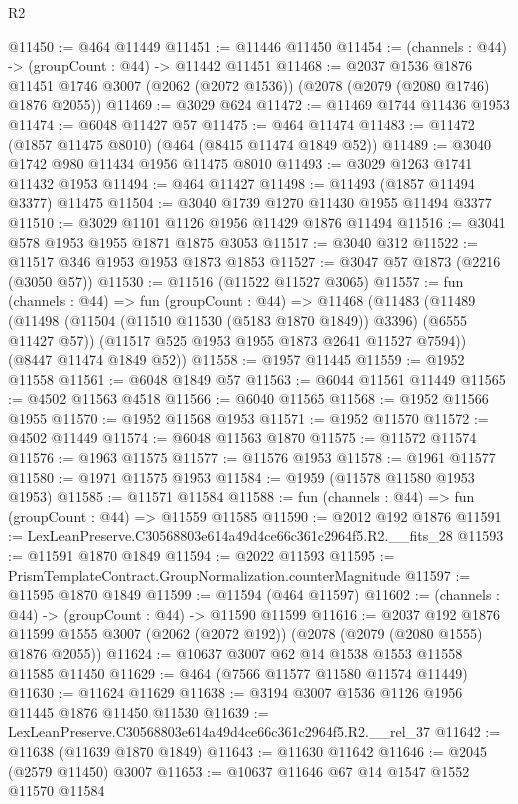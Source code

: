 \begin{lexlean}{R2}
\begin{coremodule}
@11450 := @464 @11449
@11451 := @11446 @11450
@11454 := (channels : @44) -> (groupCount : @44) -> @11442 @11451
@11468 := @2037
    @1536
    @1876
    @11451
    @1746
    @3007
    (@2062 (@2072 @1536))
    (@2078 (@2079 (@2080 @1746) @1876 @2055))
@11469 := @3029 @624
@11472 := @11469 @1744 @11436 @1953
@11474 := @6048 @11427 @57
@11475 := @464 @11474
@11483 := @11472 (@1857 @11475 @8010) (@464 (@8415 @11474 @1849 @52))
@11489 := @3040 @1742 @980 @11434 @1956 @11475 @8010
@11493 := @3029 @1263 @1741 @11432 @1953
@11494 := @464 @11427
@11498 := @11493 (@1857 @11494 @3377) @11475
@11504 := @3040 @1739 @1270 @11430 @1955 @11494 @3377
@11510 := @3029 @1101 @1126 @1956 @11429 @1876 @11494
@11516 := @3041 @578 @1953 @1955 @1871 @1875 @3053
@11517 := @3040 @312
@11522 := @11517 @346 @1953 @1953 @1873 @1853
@11527 := @3047 @57 @1873 (@2216 (@3050 @57))
@11530 := @11516 (@11522 @11527 @3065)
@11557 := fun (channels : @44) =>
  fun (groupCount : @44) =>
  @11468
    (@11483
      (@11489
        (@11498 (@11504 (@11510 @11530 (@5183 @1870 @1849)) @3396) (@6555 @11427 @57))
        (@11517 @525 @1953 @1955 @1873 @2641 @11527 @7594))
      (@8447 @11474 @1849 @52))
@11558 := @1957 @11445
@11559 := @1952 @11558
@11561 := @6048 @1849 @57
@11563 := @6044 @11561 @11449
@11565 := @4502 @11563 @4518
@11566 := @6040 @11565
@11568 := @1952 @11566 @1955
@11570 := @1952 @11568 @1953
@11571 := @1952 @11570
@11572 := @4502 @11449
@11574 := @6048 @11563 @1870
@11575 := @11572 @11574
@11576 := @1963 @11575
@11577 := @11576 @1953
@11578 := @1961 @11577
@11580 := @1971 @11575 @1953
@11584 := @1959 (@11578 @11580 @1953 @1953)
@11585 := @11571 @11584
@11588 := fun (channels : @44) => fun (groupCount : @44) => @11559 @11585
@11590 := @2012 @192 @1876
@11591 := LexLeanPreserve.C30568803e614a49d4ce66c361c2964f5.R2.__fits_28
@11593 := @11591 @1870 @1849
@11594 := @2022 @11593
@11595 := PrismTemplateContract.GroupNormalization.counterMagnitude
@11597 := @11595 @1870 @1849
@11599 := @11594 (@464 @11597)
@11602 := (channels : @44) -> (groupCount : @44) -> @11590 @11599
@11616 := @2037
    @192
    @1876
    @11599
    @1555
    @3007
    (@2062 (@2072 @192))
    (@2078 (@2079 (@2080 @1555) @1876 @2055))
@11624 := @10637 @3007 @62 @14 @1538 @1553 @11558 @11585 @11450
@11629 := @464 (@7566 @11577 @11580 @11574 @11449)
@11630 := @11624 @11629
@11638 := @3194 @3007 @1536 @1126 @1956 @11445 @1876 @11450 @11530
@11639 := LexLeanPreserve.C30568803e614a49d4ce66c361c2964f5.R2.__rel_37
@11642 := @11638 (@11639 @1870 @1849)
@11643 := @11630 @11642
@11646 := @2045 (@2579 @11450) @3007
@11653 := @10637 @11646 @67 @14 @1547 @1552 @11570 @11584

\end{coremodule}
\end{lexlean}

